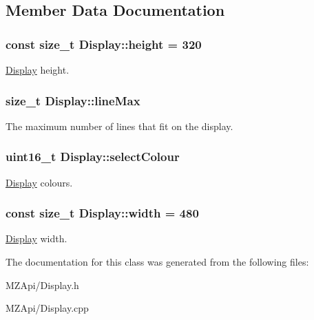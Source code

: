 \subsection{Member Data Documentation}
\subsubsection[{\texorpdfstring{height}{height}}]{\setlength{\rightskip}{0pt plus 5cm}const size\+\_\+t Display\+::height = 320\hspace{0.3cm}{\ttfamily [static]}}\hypertarget{classDisplay_ac677f0db63e8eef2373fe84791cad17c}{}\label{classDisplay_ac677f0db63e8eef2373fe84791cad17c}
\hyperlink{classDisplay}{Display} height. 
\subsubsection[{\texorpdfstring{line\+Max}{lineMax}}]{\setlength{\rightskip}{0pt plus 5cm}size\+\_\+t Display\+::line\+Max}\hypertarget{classDisplay_a7183e09a442a157a00391639a34cd4d8}{}\label{classDisplay_a7183e09a442a157a00391639a34cd4d8}
The maximum number of lines that fit on the display. 
\subsubsection[{\texorpdfstring{select\+Colour}{selectColour}}]{\setlength{\rightskip}{0pt plus 5cm}uint16\+\_\+t Display\+::select\+Colour}\hypertarget{classDisplay_a1487285b39c53295e92cad6b3074a924}{}\label{classDisplay_a1487285b39c53295e92cad6b3074a924}
\hyperlink{classDisplay}{Display} colours. 
\subsubsection[{\texorpdfstring{width}{width}}]{\setlength{\rightskip}{0pt plus 5cm}const size\+\_\+t Display\+::width = 480\hspace{0.3cm}{\ttfamily [static]}}\hypertarget{classDisplay_a6f1dec624224569510e05c937d33ac4d}{}\label{classDisplay_a6f1dec624224569510e05c937d33ac4d}
\hyperlink{classDisplay}{Display} width. 

The documentation for this class was generated from the following files\+:\begin{DoxyCompactItemize}
\item 
M\+Z\+Api/Display.\+h\item 
M\+Z\+Api/Display.\+cpp\end{DoxyCompactItemize}

